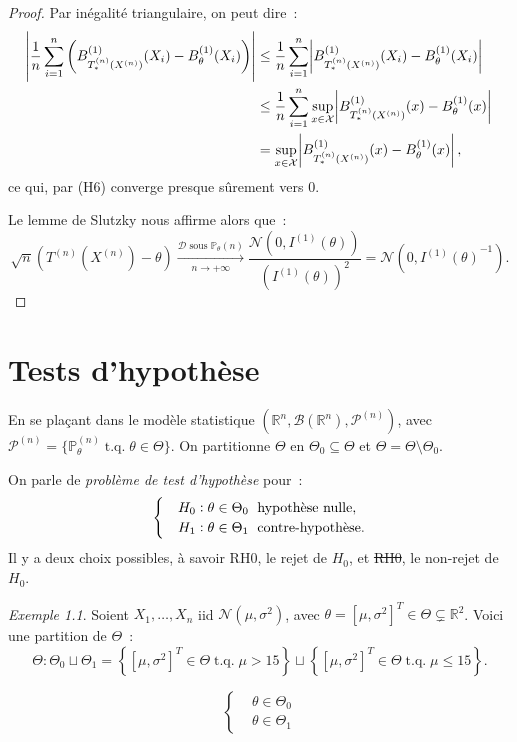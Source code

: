 \documentclass{report}
\DeclareMathOperator{\tq}{\text{ t.q. }}
\renewcommand{\P}{\mathbb P}
\newcommand{\pinfty}{{+\infty}}
\newcommand{\statmod}[4]{\left(#1^{#4}, #2\left(#1^{#4}\right), #3^{\left(#4\right)}\right)}
\newcommand{\Nms}{\mathcal N(\mu, \sigma^2)}
\newcommand{\R}{\mathbb R}
\newcommand{\Brl}{\mathcal B}  %
\newcommand{\n}{{(n)}}
\newcommand{\Xn}{{X^\n}}
\newcommand{\Tn}{{T^\n}}
\newcommand{\TnXn}{{\Tn(\Xn)}}
\theoremstyle{definition}
\theoremstyle{remark}
\newtheorem{ex}{Exemple}[chapter]
\begin{document}
\begin{proof}
			Par inégalité triangulaire, on peut dire~:
			\begin{align*}
				\abs {\frac 1n \sum_{i=1}^n\left(B_{T_*^{(n)}(\Xn)}^{(1)}(X_i) - B_\theta^{(1)}(X_i)\right)}
					&\leq \frac 1n\sum_{i=1}^n\abs {B_{T_*^{(n)}(\Xn)}^{(1)}(X_i) - B_\theta^{(1)}(X_i)} \\
				&\leq \frac 1n\sum_{i=1}^n\sup_{x \in \mathcal X}\abs {B_{T_*^{(n)}(\Xn)}^{(1)}(x) - B_\theta^{(1)}(x)} \\
				&= \sup_{x \in \mathcal X}\abs {B_{T_*^{(n)}(\Xn)}^{(1)}(x) - B_\theta^{(1)}(x)},
			\end{align*}
			ce qui, par (H6) converge presque sûrement vers 0.

			Le lemme de Slutzky nous affirme alors que~:
			\[\sqrt n\left(\TnXn - \theta\right) \xrightarrow[n \to \pinfty]{\mathcal D \text{ sous } \P_\theta{(n)}}
				\frac {\mathcal N(0, I^{(1)}(\theta))}{\left(I^{(1)}(\theta)\right)^2} = \mathcal N(0, {I^{(1)}(\theta)}^{-1}).\]
			\end{proof}

\chapter{Tests d'hypothèse}
	En se plaçant dans le modèle statistique $\statmod \R\Brl{\mathcal P}n$, avec $\mathcal P^{(n)} = \{\P_\theta^{(n)} \tq \theta \in \Theta\}$. On partitionne
	$\Theta$ en $\Theta_0 \subseteq \Theta$ et $\Theta = \Theta \setminus \Theta_0$.

	On parle de \textit{problème de test d'hypothèse} pour~:
	\begin{align}\label{eq:test_hyp_general}
		\begin{cases}
			&H_0 : \theta \in \Theta_0 \text{\; hypothèse nulle}, \\
			&H_1 : \theta \in \Theta_1 \text{\; contre-hypothèse}.
		\end{cases}
	\end{align}
	Il y a deux choix possibles, à savoir RH0, le rejet de $H_0$, et \sout {RH0}, le non-rejet de $H_0$.

	\begin{ex} Soient $X_1, \ldots, X_n$ iid $\Nms$, avec $\theta = [\mu, \sigma^2]^T \in \Theta \subsetneq \R^2$. Voici une partition de $\Theta$~:
	\[\Theta : \Theta_0 \sqcup \Theta_1 = \left\{[\mu, \sigma^2]^T \in \Theta \tq \mu > 15\right\}
		\sqcup \left\{[\mu, \sigma^2]^T \in \Theta \tq \mu \leq 15\right\}.\]

	\[\begin{cases}
		&\theta \in \Theta_0 \\
		&\theta \in \Theta_1
	\end{cases}\]
	\end{ex}
\end{document}
